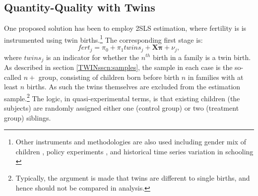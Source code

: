 \documentclass[subeqn]{article}
\begin{document}
\begin{spacing}{1.4}
\subsection{Quantity-Quality with Twins}           \label{TWINsscn:methodQQ}
One proposed solution has been to employ 2SLS estimation, where fertility is 
is instrumented using twin births.\footnote{Other instruments and methodologies 
are also used including gender mix of children \citep{Angristetal2010}, policy 
experiments \citep{Qian2009}, and historical time series variation in schooling 
\citep{BleakleyLange2009}}  The corresponding first stage is:
\begin{equation}
\label{TWINeqn:firststage}
fert_{j}=\pi_0+\pi_1 twins_{j}+\bm{X}\bm{\pi}+\nu_{j},
\end{equation}
where $twins_j$ is an indicator for whether the $n^{th}$ birth in a family is a 
twin birth. As described in section \ref{TWINsscn:samples}, the sample in each 
case is the so-called $n+$ group, consisting of children born before birth $n$ 
in families with at least $n$ births.  As such the twins themselves are excluded 
from the estimation sample.\footnote{Typically, the argument is made that twins 
are different to single births, and hence should not be compared in analysis.}
The logic, in quasi-experimental terms, is that existing children (the subjects) 
are randomly assigned either one (control group) or two (treatment group) 
siblings.


\end{spacing}
\end{document}
